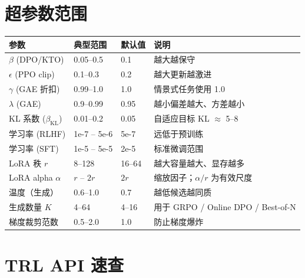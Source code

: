 \section{超参数范围}
\label{hyperparameter-ranges}

\begin{center}
\begin{tabularx}{0.88\linewidth}{@{}l Z{0.61} Z{0.42} Z{1.97}@{}}
\toprule
\textbf{参数} & \textbf{典型范围} & \textbf{默认值} & \textbf{说明} \\
\midrule
$\beta$ (DPO/KTO) & 0.05--0.5 & 0.1 & 越大越保守 \\
$\epsilon$ (PPO clip) & 0.1--0.3 & 0.2 & 越大更新越激进 \\
$\gamma$ (GAE 折扣) & 0.99--1.0 & 1.0 & 情景式任务使用 1.0 \\
$\lambda$ (GAE) & 0.9--0.99 & 0.95 & 越小偏差越大、方差越小 \\
KL 系数 ($\beta_\text{KL}$) & 0.01--0.2 & 0.05 & 自适应目标 KL $\approx$ 5--8 \\
学习率 (RLHF) & 1e-7 -- 5e-6 & 5e-7 & 远低于预训练 \\
学习率 (SFT) & 1e-5 -- 5e-5 & 2e-5 & 标准微调范围 \\
LoRA 秩 $r$ & 8--128 & 16--64 & 越大容量越大、显存越多 \\
LoRA alpha $\alpha$ & $r$ -- $2r$ & $2r$ & 缩放因子；$\alpha/r$ 为有效尺度 \\
温度（生成） & 0.6--1.0 & 0.7 & 越低候选越同质 \\
生成数量 $K$ & 4--64 & 4--16 & 用于 GRPO / Online DPO / Best-of-N \\
梯度裁剪范数 & 0.5--2.0 & 1.0 & 防止梯度爆炸 \\
\bottomrule
\end{tabularx}
\end{center}

\section{TRL API 速查}
\label{trl-api-quick-reference}

